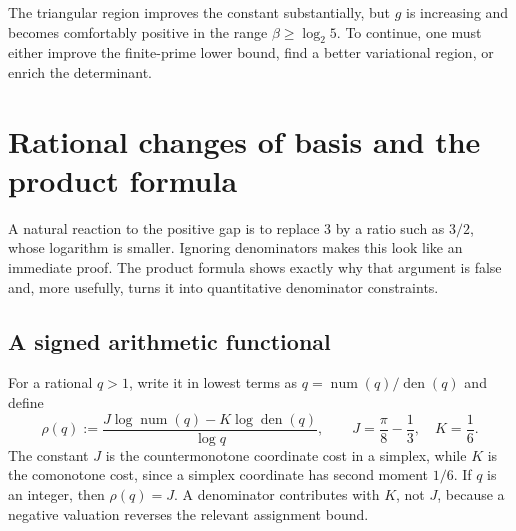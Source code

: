 \documentclass[11pt]{article}
\theoremstyle{definition}
\newcommand{\num}{\operatorname{num}}
\newcommand{\den}{\operatorname{den}}
\begin{document}
The triangular region improves the constant substantially, but $g$ is
increasing and becomes comfortably positive in the range $\beta\ge\log_2 5$.
To continue, one must either improve the finite-prime lower bound, find a
better variational region, or enrich the determinant.

\section{Rational changes of basis and the product formula}

A natural reaction to the positive gap is to replace $3$ by a ratio such as
$3/2$, whose logarithm is smaller.  Ignoring denominators makes this look like
an immediate proof.  The product formula shows exactly why that argument is
false and, more usefully, turns it into quantitative denominator constraints.

\subsection{A signed arithmetic functional}

For a rational $q>1$, write it in lowest terms as
$q=\num(q)/\den(q)$ and define
\begin{equation}\label{eq:rho}
 \rho(q):=
 \frac{J\log\num(q)-K\log\den(q)}{\log q},
 \qquad
 J=\frac\pi8-\frac13,\quad K=\frac16.
\end{equation}
The constant $J$ is the countermonotone coordinate cost in a simplex, while
$K$ is the comonotone cost, since a simplex coordinate has second moment
$1/6$.  If $q$ is an integer, then $\rho(q)=J$.  A denominator contributes with
$K$, not $J$, because a negative valuation reverses the relevant assignment
bound.
\end{document}
